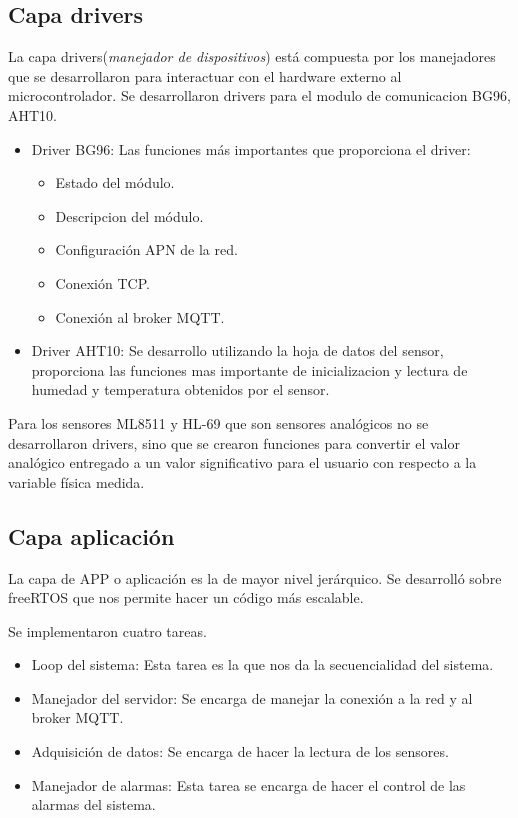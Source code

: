 \subsection{Capa drivers} 
La capa drivers(\textit{manejador de dispositivos}) está compuesta por los manejadores que se desarrollaron para interactuar con el hardware externo al microcontrolador. Se desarrollaron drivers para el modulo de comunicacion BG96, AHT10.
\begin{itemize}
  \item Driver BG96: Las funciones más importantes que proporciona el driver:
  \begin{itemize}
    \item Estado del módulo.
    \item Descripcion del módulo.
    \item Configuración APN de la red.
    \item Conexión TCP.
    \item Conexión al broker MQTT.
  \end{itemize}
  \item Driver AHT10: Se desarrollo utilizando la hoja de datos del sensor, proporciona las funciones mas importante de inicializacion y lectura de humedad y temperatura obtenidos por el sensor.
\end{itemize}
Para los sensores ML8511 y HL-69 que son sensores analógicos no se desarrollaron drivers, sino que se crearon funciones para convertir el valor analógico entregado a un valor significativo para el usuario con respecto a la variable física medida.
\subsection{Capa aplicación} 
La capa de APP o aplicación  es la de mayor nivel jerárquico. Se desarrolló sobre freeRTOS 
que nos permite hacer un código más escalable.

Se implementaron cuatro tareas.
\begin{itemize}
    \item Loop del sistema: Esta tarea es la que nos da la secuencialidad del sistema.
    \item Manejador del  servidor: Se encarga de manejar la conexión a la red y al broker MQTT.
    \item Adquisición de datos: Se encarga de hacer la lectura de los sensores.
    \item Manejador de alarmas: Esta tarea se encarga de hacer el control de las alarmas del sistema.
\end{itemize}
\clearpage

